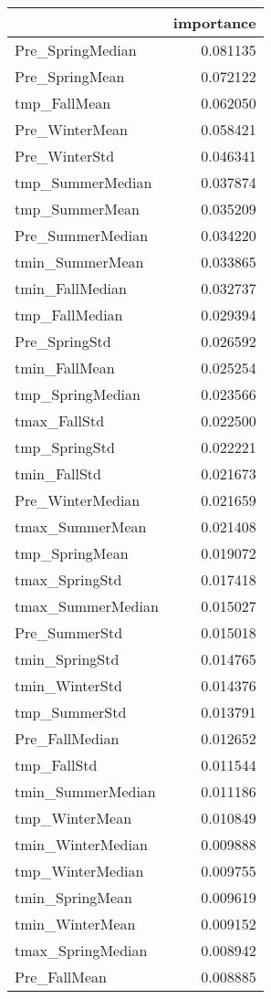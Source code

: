 \begin{tabular}{lr}
\toprule
 & importance \\
\midrule
Pre_SpringMedian & 0.081135 \\
Pre_SpringMean & 0.072122 \\
tmp_FallMean & 0.062050 \\
Pre_WinterMean & 0.058421 \\
Pre_WinterStd & 0.046341 \\
tmp_SummerMedian & 0.037874 \\
tmp_SummerMean & 0.035209 \\
Pre_SummerMedian & 0.034220 \\
tmin_SummerMean & 0.033865 \\
tmin_FallMedian & 0.032737 \\
tmp_FallMedian & 0.029394 \\
Pre_SpringStd & 0.026592 \\
tmin_FallMean & 0.025254 \\
tmp_SpringMedian & 0.023566 \\
tmax_FallStd & 0.022500 \\
tmp_SpringStd & 0.022221 \\
tmin_FallStd & 0.021673 \\
Pre_WinterMedian & 0.021659 \\
tmax_SummerMean & 0.021408 \\
tmp_SpringMean & 0.019072 \\
tmax_SpringStd & 0.017418 \\
tmax_SummerMedian & 0.015027 \\
Pre_SummerStd & 0.015018 \\
tmin_SpringStd & 0.014765 \\
tmin_WinterStd & 0.014376 \\
tmp_SummerStd & 0.013791 \\
Pre_FallMedian & 0.012652 \\
tmp_FallStd & 0.011544 \\
tmin_SummerMedian & 0.011186 \\
tmp_WinterMean & 0.010849 \\
tmin_WinterMedian & 0.009888 \\
tmp_WinterMedian & 0.009755 \\
tmin_SpringMean & 0.009619 \\
tmin_WinterMean & 0.009152 \\
tmax_SpringMedian & 0.008942 \\
Pre_FallMean & 0.008885 \\

\end{tabular}
